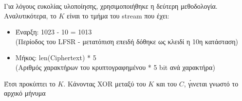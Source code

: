 \documentclass[a4paper, 11pt]{article}
\newcommand{\lt}{\latintext}
\begin{document}
Για λόγους ευκολίας υλοποίησης, χρησιμοποιήθηκε η δεύτερη μεθοδολογία. Αναλυτικότερα, το $Κ$ είναι το τμήμα του {\lt stream} που έχει:\\
\begin{itemize}
\item Έναρξη: 1023 - 10 = 1013 \\(Περίοδος του {\lt LFSR} - μετατόπιση επειδή δόθηκε ως κλειδί η 10η κατάσταση)\\
\item Μήκος: {\lt len(Ciphertext)} * 5 \\(Αριθμός χαρακτήρων του κρυπτογραφημένου * 5 {\lt bit} ανά χαρακτήρα)\\
\end{itemize}

Έτσι προκύπτει το $K$. Κάνοντας {\lt XOR} μεταξύ του $K$ και του $C$, γ́ινεται γνωστό το αρχικό μήνυμα
\end{document}
